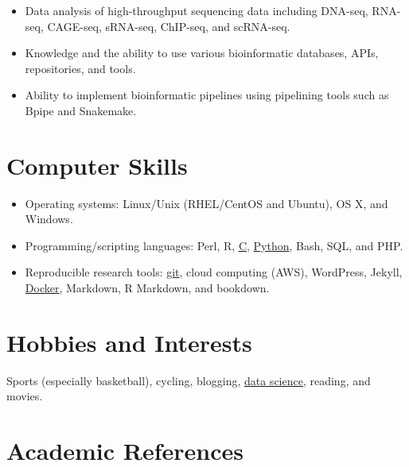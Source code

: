 \documentclass[a4paper, 10pt]{article}
\begin{document}
\begin{itemize}
   \setlength\itemsep{0em}
   \item Data analysis of high-throughput sequencing data including DNA-seq, RNA-seq, CAGE-seq, sRNA-seq, ChIP-seq, and scRNA-seq.
   \item Knowledge and the ability to use various bioinformatic databases, APIs, repositories, and tools.
   \item Ability to implement bioinformatic pipelines using pipelining tools such as Bpipe and Snakemake.
\end{itemize}

\section*{Computer Skills}

\begin{itemize}
   \setlength\itemsep{0em}
   \item Operating systems: Linux/Unix (RHEL/CentOS and Ubuntu), OS X, and Windows.
   \item Programming/scripting languages: Perl, R, \href{https://github.com/davetang/getting_started_with_c}{C}, \href{https://github.com/davetang/learning_python}{Python}, Bash, SQL, and PHP.
   \item Reproducible research tools: \href{https://github.com/davetang/getting_started_with_git}{git}, cloud computing (AWS), WordPress, Jekyll, \href{https://github.com/davetang/learning_docker/}{Docker}, Markdown, R Markdown, and bookdown.
\end{itemize}

\section*{Hobbies and Interests}
Sports (especially basketball), cycling, blogging, \href{https://www.datacamp.com/profile/davetang31}{data science}, reading, and movies.

\section*{Academic References}
\end{document}
